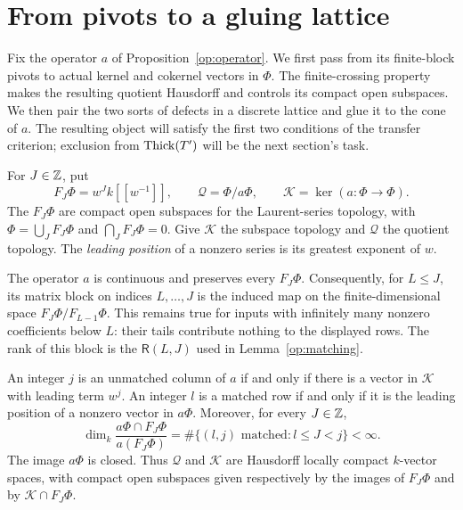 \section{From pivots to a gluing lattice}
\label{glue:section}

Fix the operator $a$ of Proposition~\ref{op:operator}. We first pass
from its finite-block pivots to actual kernel and cokernel vectors in
$\Phi$. The finite-crossing property makes the resulting quotient
Hausdorff and controls its compact open subspaces. We then pair the
two sorts of defects in a discrete lattice and glue it to the cone of
$a$. The resulting object will satisfy the first two conditions of
the transfer criterion; exclusion from $\operatorname{Thick}(T')$ will be the next
section's task.

For $J\in\mathbb Z$, put
\begin{equation}
 F_J\Phi=w^Jk[[w^{-1}]],\qquad
 \mathcal Q=\Phi/a\Phi,\qquad
 \mathcal K=\ker(a:\Phi\longrightarrow\Phi).
 \label{glue:spaces}
\end{equation}
The $F_J\Phi$ are compact open subspaces for the Laurent-series
topology, with $\Phi=\bigcup_JF_J\Phi$ and
$\bigcap_JF_J\Phi=0$. Give $\mathcal K$ the subspace topology and
$\mathcal Q$ the quotient topology. The \emph{leading position} of
a nonzero series is its greatest exponent of $w$.

The operator $a$ is continuous and preserves every $F_J\Phi$.
Consequently, for $L\le J$, its matrix block on indices
$L,\ldots,J$ is the induced map on the finite-dimensional space
$F_J\Phi/F_{L-1}\Phi$. This remains true for inputs with infinitely
many nonzero coefficients below $L$: their tails contribute nothing
to the displayed rows. The rank of this block is the
$\mathsf R(L,J)$ used in Lemma~\ref{op:matching}.

\begin{lemma}
\label{glue:pivot-topology}
An integer $j$ is an unmatched column of $a$ if and only if there is
a vector in $\mathcal K$ with leading term $w^j$. An integer $l$ is
a matched row if and only if it is the leading position of a nonzero
vector in $a\Phi$. Moreover, for every $J\in\mathbb Z$,
\begin{equation}
 \dim_k\frac{a\Phi\cap F_J\Phi}{a(F_J\Phi)}
   =\#\{(l,j)\text{ matched}:l\le J<j\}<\infty.
 \label{glue:crossing-quotient}
\end{equation}
The image $a\Phi$ is closed. Thus $\mathcal Q$ and $\mathcal K$ are
Hausdorff locally compact $k$-vector spaces, with compact open
subspaces given respectively by the images of $F_J\Phi$ and by
$\mathcal K\cap F_J\Phi$.
\end{lemma}

